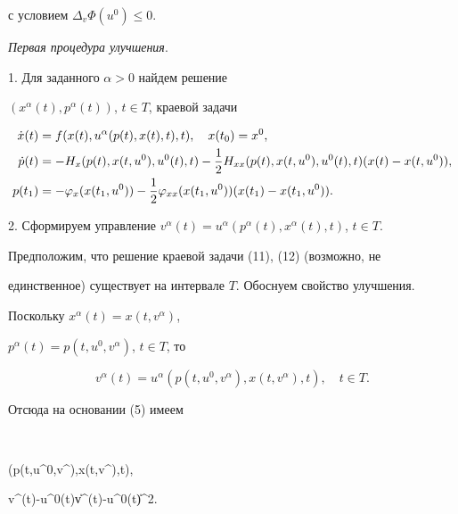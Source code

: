 с условием $\Delta_{v}\Phi(u^0)\leq{0}$.





{\em Первая процедура улучшения}.





1. Для заданного $\alpha>0$ найдем решение


$(x^{\alpha}(t),p^{\alpha}(t))$, $t\in{T}$, краевой задачи


\begin{align}


\Dot{x}(t)&=f(x(t),u^{\alpha}(p(t),x(t),t),t),\quad{}x(t_0)=x^{0},\\


\Dot{p}(t)&=-H_{x}(p(t),x(t,u^0),u^0(t),t)-


\frac{1}{2}H_{xx}(p(t),x(t,u^0),u^0(t),t)(x(t)-x(t,u^0)),\notag \\


p(t_1)&=-\varphi_{x}(x(t_1,u^0))-\frac{1}{2}\varphi_{xx}(x(t_1,u^0))


(x(t_1)-x(t_1,u^0)).


\end{align}





2. Сформируем управление $v^{\alpha}(t)=u^{\alpha}(p^{\alpha}(t),


x^{\alpha}(t),t)$, ${t}\in{T}$.





Предположим, что решение краевой задачи (11), (12) (возможно, не


единственное) существует на интервале $T$. Обоснуем свойство улучшения.


Поскольку $x^{\alpha}(t)=x(t,v^{\alpha})$,


$p^{\alpha}(t)=p(t,u^0,v^{\alpha})$, $t\in{T}$, то


\begin{equation}


v^{\alpha}(t)=u^{\alpha}(p(t,u^0,v^{\alpha}),x(t,v^{\alpha}),t),


\quad{}t\in{T}.


\end{equation}


Отсюда на основании (5) имеем


$$


(p(t,u^0,v^{\alpha}),x(t,v^{\alpha}),t),


v^{\alpha}(t)-u^{0}(t)\rangle\geq{}\|v^{\alpha}(t)-u^{0}(t)\|^2.


